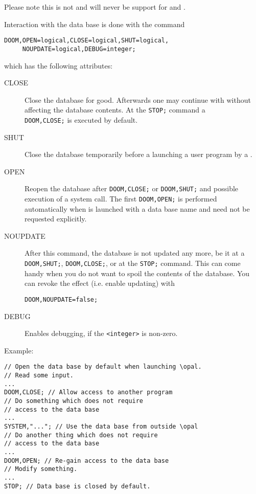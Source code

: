 Please note this is not and will never be support for \noopalt and \noopalcycl .

Interaction with the data base is done with the command
\begin{verbatim}
DOOM,OPEN=logical,CLOSE=logical,SHUT=logical,
     NOUPDATE=logical,DEBUG=integer;
\end{verbatim}
which has the following attributes:
\begin{description}
\item[CLOSE]
  Close the database for good. Afterwards one may continue with \opal without 
  affecting the database contents. At the \texttt{STOP;} command a \\
  \texttt{DOOM,CLOSE;} is executed by default.
\item[SHUT]
  Close the database temporarily before a launching a user program by a
  .
\item[OPEN]
  Reopen the database after \texttt{DOOM,CLOSE;} or \texttt{DOOM,SHUT;} 
  and possible execution of a system call. 
  The first \texttt{DOOM,OPEN;} is performed automatically when \opal 
  is launched with a data base name and need not be requested explicitly. 
\item[NOUPDATE]
  After this command, the database is not updated any more, be it at
  a \texttt{DOOM,SHUT;}, \texttt{DOOM,CLOSE;}, or at the \texttt{STOP;} 
  command. 
  This can come handy when you do not want to spoil the contents of the 
  database. 
  You can revoke the effect (i.e. enable updating) with
\begin{verbatim}
DOOM,NOUPDATE=false;
\end{verbatim}
\item[DEBUG]
  Enables debugging, if the \texttt{<integer>} is non-zero.
\end{description}
\noindent Example:
\begin{verbatim}
// Open the data base by default when launching \opal.
// Read some input.
...
DOOM,CLOSE; // Allow access to another program
// Do something which does not require 
// access to the data base
...
SYSTEM,"..."; // Use the data base from outside \opal
// Do another thing which does not require 
// access to the data base
...
DOOM,OPEN; // Re-gain access to the data base
// Modify something.
...
STOP; // Data base is closed by default.
\end{verbatim}

